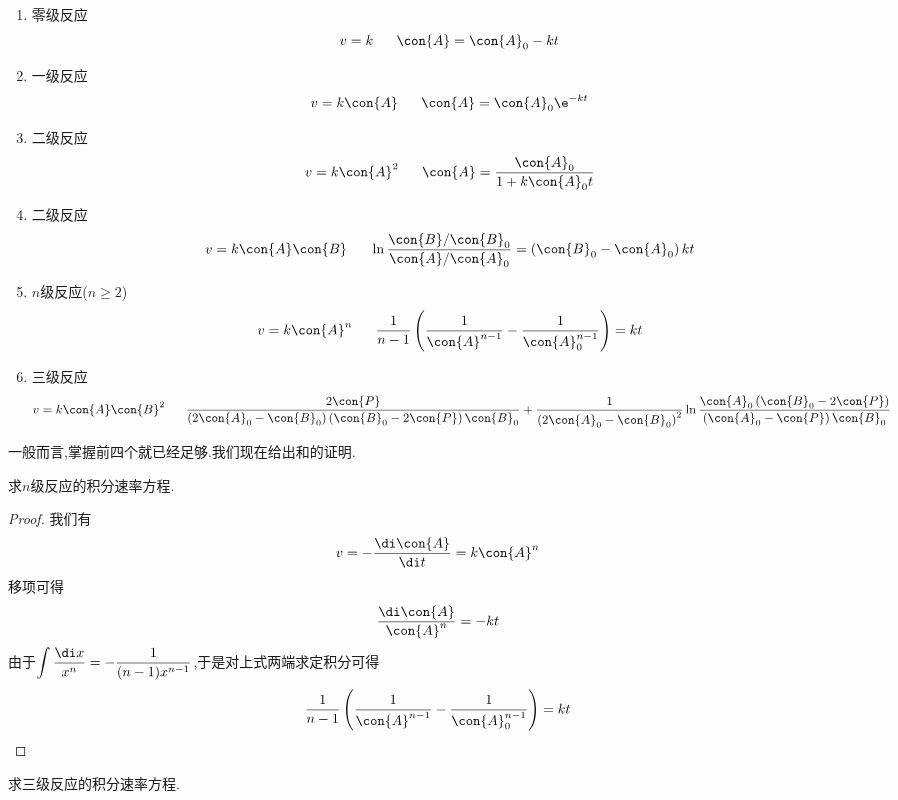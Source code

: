 \documentclass{ctexart}
\begin{document}
\begin{theorem}[7B.2.1 积分速率方程表]
    \begin{enumerate}[topsep=0pt,parsep=0pt,itemsep=0pt,partopsep=0pt,label=\tbf{\arabic*.}]
        \item 零级反应
            \[v=k\ \ \ \ \ \con{A}=\con{A}_0-kt\]
        \item 一级反应
            \[v=k\con{A}\ \ \ \ \ \con{A}=\con{A}_0\e^{-kt}\]
        \item 二级反应
            \[v=k\con{A}^2\ \ \ \ \ \con{A}=\dfrac{\con{A}_0}{1+k\con{A}_0t}\]
        \item 二级反应
            \[v=k\con{A}\con{B}\ \ \ \ \ \ln\dfrac{\con{B}/\con{B}_0}{\con{A}/\con{A}_0}=\left(\con{B}_0-\con{A}_0\right)kt\]
        \item $n$级反应($n\geqslant2$)
            \[v=k\con{A}^n\ \ \ \ \ \dfrac{1}{n-1}\left(\dfrac{1}{\con{A}^{n-1}}-\dfrac{1}{\con{A}_0^{n-1}}\right)=kt\]
        \item 三级反应
            \[v=k\con{A}\con{B}^2\ \ \ \ \ 
            \dfrac{2\con{P}}{\left(2\con{A}_0-\con{B}_0\right)\left(\con{B}_0-2\con{P}\right)\con{B}_0}
            +\dfrac{1}{\left(2\con{A}_0-\con{B}_0\right)^2}\ln\dfrac{\con{A}_0\left(\con{B}_0-2\con{P}\right)}
            {\left(\con{A}_0-\con{P}\right)\con{B}_0}\]
        
    \end{enumerate}
\end{theorem}
一般而言,掌握前四个就已经足够.我们现在给出和的证明.
\begin{problem}[P.7B.1]
    求$n$级反应的积分速率方程.
\end{problem}
\begin{proof}
    我们有
    \[v=-\dfrac{\di\con{A}}{\di t}=k\con{A}^n\]
    移项可得
    \[\dfrac{\di\con{A}}{\con{A}^n}=-kt\]
    由于$\displaystyle\int\dfrac{\di x}{x^n}=-\dfrac{1}{(n-1)x^{n-1}}$,于是对上式两端求定积分可得
    \[\dfrac{1}{n-1}\left(\dfrac{1}{\con{A}^{n-1}}-\dfrac{1}{\con{A}_0^{n-1}}\right)=kt\]

\end{proof}
\begin{problem}[P.7B.1]
    求三级反应的积分速率方程.
\end{problem}
\end{document}
